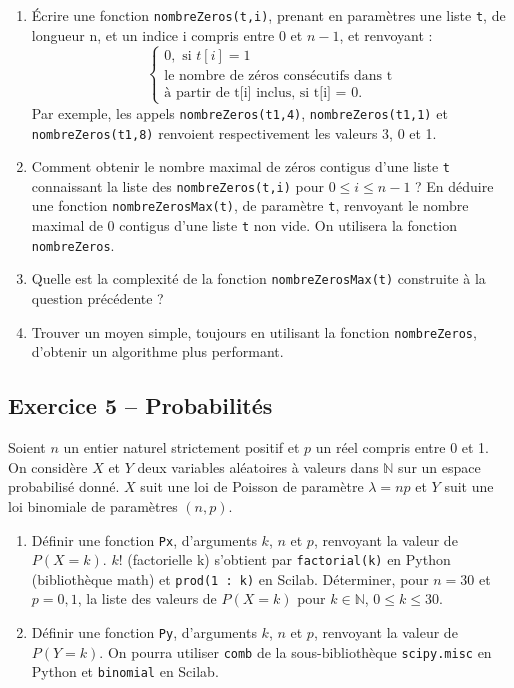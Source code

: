 \documentclass[10pt,fleqn]{article} %
\begin{document}
\begin{multicols}{2}
\begin{enumerate}
\item Écrire une fonction \texttt{nombreZeros(t,i)}, prenant en paramètres une liste \texttt{t}, de longueur n, et un indice i compris entre 0 et $n-1$, et renvoyant :
$$
\left\{
\begin{array}{l}
0, \text{ si } t[i]=1 \\
\text{le  nombre de zéros consécutifs dans t} \\ \text{à partir de t[i] inclus, si t[i] = 0}.
\end{array}
\right.
$$
Par exemple, les appels \texttt{nombreZeros(t1,4)}, \texttt{nombreZeros(t1,1)} et \texttt{nombreZeros(t1,8)} renvoient respectivement les valeurs 3, 0 et 1.
\item Comment obtenir le nombre maximal de zéros contigus d’une liste \texttt{t} connaissant la liste des \texttt{nombreZeros(t,i)} pour $0\leq i \leq n-1$ ?
En déduire une fonction \texttt{nombreZerosMax(t)}, de paramètre \texttt{t}, renvoyant le nombre maximal de 0 contigus d’une liste \texttt{t} non vide. On utilisera la fonction \texttt{nombreZeros}.
\item Quelle est la complexité de la fonction \texttt{nombreZerosMax(t)} construite à la question précédente ?
\item Trouver un moyen simple, toujours en utilisant la fonction \texttt{nombreZeros}, d’obtenir un algorithme plus performant.
\end{enumerate}

\subsection*{Exercice 5 -- Probabilités}
Soient $n$ un entier naturel strictement positif et $p$ un réel compris entre 0 et 1.
On considère $X$ et $Y$ deux variables aléatoires à valeurs dans $\mathbb{N}$ sur un espace probabilisé donné. $X$ suit une
loi de Poisson de paramètre $\lambda = np$ et $Y$ suit une loi binomiale de paramètres $(n, p)$.

\begin{enumerate}
\item Définir une fonction \texttt{Px}, d’arguments $k$, $n$ et $p$, renvoyant la valeur de $P(X = k)$. $k!$ (factorielle k) s’obtient par \texttt{factorial(k)} en Python (bibliothèque math) et \texttt{prod(1 : k)} en Scilab.
Déterminer, pour $n = 30$ et $p = 0,1$, la liste des valeurs de $P(X = k)$ pour $k \in \mathbb{N}$, $0 \leq k \leq 30 $.
\item Définir une fonction \texttt{Py}, d’arguments $k$, $n$ et $p$, renvoyant la valeur de $P(Y = k)$.
On pourra utiliser \texttt{comb} de la sous-bibliothèque \texttt{scipy.misc} en Python et \texttt{binomial} en Scilab.


\end{enumerate}
\end{multicols}
\end{document}
